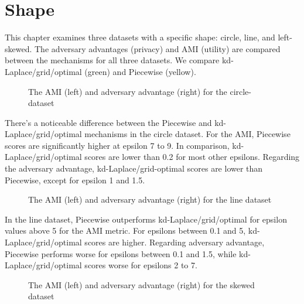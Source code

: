{{  \section{Shape}
  This chapter examines three datasets with a specific shape: circle, line, and left-skewed.
  The adversary advantages (privacy) and AMI (utility) are compared between the mechanisms for all three datasets.
  We compare kd-Laplace/grid/optimal (green) and Piecewise (yellow).
  \begin{figure}[H]
    \begin{minipage}[c]{0.55\textwidth}
    \end{minipage}
    \begin{minipage}[c]{0.55\textwidth}
    \end{minipage}
    \label{fig:advantage_circle-dataset_comparison}
    \caption{The AMI (left) and adversary advantage (right) for the circle-dataset}
  \end{figure}
  There's a noticeable difference between the Piecewise and kd-Laplace/grid/optimal mechanisms in the circle dataset. For the AMI, Piecewise scores are significantly higher at epsilon 7 to 9. In comparison, kd-Laplace/grid/optimal scores are lower than 0.2 for most other epsilons. Regarding the adversary advantage, kd-Laplace/grid-optimal scores are lower than Piecewise, except for epsilon 1 and 1.5.
  \begin{figure}[H]
    \begin{minipage}[c]{0.55\textwidth}
    \end{minipage}
    \begin{minipage}[c]{0.55\textwidth}
    \end{minipage}
    \label{fig:advantage_line-dataset_comparison}
    \caption{The AMI (left) and adversary advantage (right) for the line dataset}
  \end{figure}
  In the line dataset, Piecewise outperforms kd-Laplace/grid/optimal for epsilon values above 5 for the AMI metric. For epsilons between 0.1 and 5, kd-Laplace/grid/optimal scores are higher. Regarding adversary advantage, Piecewise performs worse for epsilons between 0.1 and 1.5, while kd-Laplace/grid/optimal scores worse for epsilons 2 to 7.
  \begin{figure}[H]
    \begin{minipage}[c]{0.55\textwidth}
    \end{minipage}
    \begin{minipage}[c]{0.55\textwidth}
    \end{minipage}
    \label{fig:advantage_skewed-dataset_comparison}
    \caption{The AMI (left) and adversary advantage (right) for the skewed dataset}


\end{figure}}}
